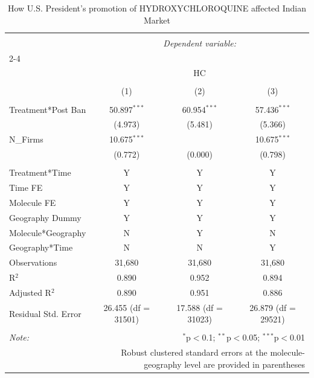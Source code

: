 \documentclass[12pt,english]{article}
\begin{document}
\begin{table}[H] \centering 
	\caption{How U.S. President's promotion of  HYDROXYCHLOROQUINE affected Indian Market} 
	\label{} 
	\footnotesize 
	\begin{tabular}{@{\extracolsep{1pt}}lccc} 
		\\[-1.8ex]\hline 
		\hline \\[-1.8ex] 
		& \multicolumn{3}{c}{\textit{Dependent variable:}} \\ 
		\cline{2-4} 
		\\[-1.8ex] & \multicolumn{3}{c}{HC} \\ 
		\\[-1.8ex] & (1) & (2) & (3)\\ 
		\hline \\[-1.8ex] 
		Treatment*Post Ban & 50.897$^{***}$ & 60.954$^{***}$ & 57.436$^{***}$ \\ 
		& (4.973) & (5.481) & (5.366) \\ 
		N_Firms & 10.675$^{***}$ &  & 10.675$^{***}$ \\ 
		& (0.772) & (0.000) & (0.798) \\ 
		\hline \\[-1.8ex] 
		Treatment*Time & Y & Y & Y \\ 
		Time FE & Y & Y & Y \\ 
		Molecule FE & Y & Y & Y \\ 
		Geography Dummy & Y & Y & Y \\ 
		Molecule*Geography & N & Y & N \\ 
		Geography*Time & N & N & Y \\ 
		Observations & 31,680 & 31,680 & 31,680 \\ 
		R$^{2}$ & 0.890 & 0.952 & 0.894 \\ 
		Adjusted R$^{2}$ & 0.890 & 0.951 & 0.886 \\ 
		Residual Std. Error & 26.455 (df = 31501) & 17.588 (df = 31023) & 26.879 (df = 29521) \\ 
		\hline 
		\hline \\[-1.8ex] 
		\textit{Note:}  & \multicolumn{3}{r}{$^{*}$p$<$0.1; $^{**}$p$<$0.05; $^{***}$p$<$0.01} \\ 
		& \multicolumn{3}{r}{Robust clustered standard errors at the molecule-geography level are provided in parentheses} \\ 
	\end{tabular} 
\end{table} 
\end{document}

